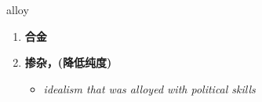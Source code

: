 
\begin{frame}
{\huge alloy}
\begin{center}
\begin{enumerate}\Large
  \item \textbf{合金}
  \item \textbf{掺杂，(降低纯度)}
  \begin{itemize}
    \item \em{\Large{idealism that was alloyed with political skills}}
  \end{itemize}
\end{enumerate}
\end{center}
\end{frame}
